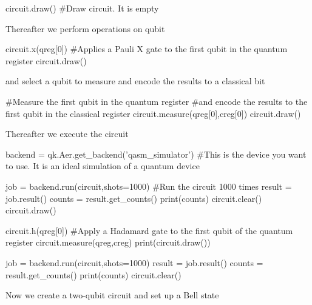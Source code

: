 \documentclass[%
oneside,                 %
final,                   %
10pt]{article}
\begin{document}
circuit.draw() #Draw circuit. It is empty

\epycod


Thereafter we perform operations on qubit




\bpycod
circuit.x(qreg[0]) #Applies a Pauli X gate to the first qubit in the quantum register
circuit.draw()

\epycod


and select  a qubit to measure and encode the results to a classical bit






\bpycod
#Measure the first qubit in the quantum register
#and encode the results to the first qubit in the classical register
circuit.measure(qreg[0],creg[0])
circuit.draw()

\epycod


Thereafter we execute the circuit
























\bpycod
backend = qk.Aer.get_backend('qasm_simulator') 
#This is the device you want to use. It is an ideal simulation of a quantum device


job = backend.run(circuit,shots=1000) #Run the circuit 1000 times
result = job.result()
counts = result.get_counts()
print(counts)
circuit.clear()
circuit.draw()


circuit.h(qreg[0]) #Apply a Hadamard gate to the first qubit of the quantum register
circuit.measure(qreg,creg)
print(circuit.draw())


job = backend.run(circuit,shots=1000)
result = job.result()
counts = result.get_counts()
print(counts)
circuit.clear()

\epycod


Now we create a two-qubit circuit and set up a Bell state
\end{document}
